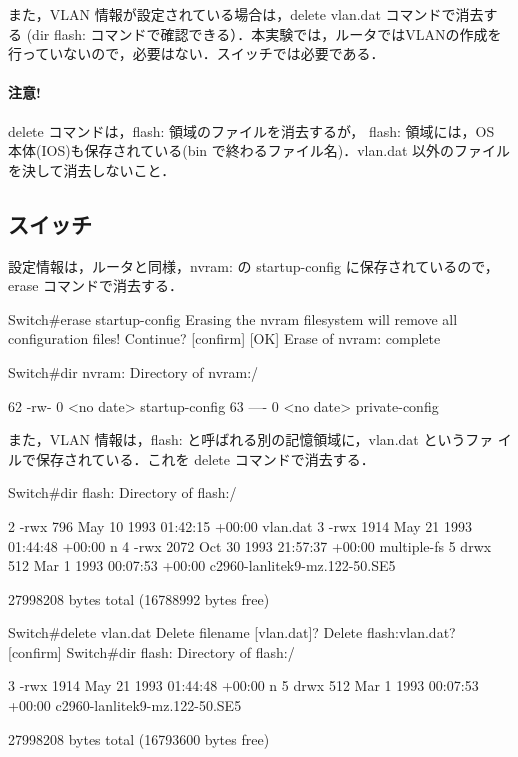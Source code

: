 また，VLAN 情報が設定されている場合は，delete vlan.dat コマンドで消去す
る (dir flash: コマンドで確認できる）．本実験では，ルータではVLANの作成を行っていないので，必要はない．スイッチでは必要である．

\paragraph{注意!} 
delete コマンドは，flash: 領域のファイルを消去するが，
flash: 領域には，OS 本体(IOS)も保存されている(bin で終わるファイル名)．vlan.dat 
以外のファイルを決して消去しないこと．

\subsection*{スイッチ}

設定情報は，ルータと同様，nvram: の startup-config に保存されているので，
erase コマンドで消去する．

\begin{cli}
Switch#erase startup-config
Erasing the nvram filesystem will remove all configuration files!
 Continue? [confirm]
[OK]
Erase of nvram: complete

Switch#dir nvram:
Directory of nvram:/

   62  -rw-           0                    <no date>  startup-config
   63  ----           0                    <no date>  private-config
\end{cli}

また，VLAN 情報は，flash: と呼ばれる別の記憶領域に，vlan.dat というファ
イルで保存されている．これを delete コマンドで消去する．

\begin{cli}
Switch#dir flash:
Directory of flash:/

    2  -rwx         796  May 10 1993 01:42:15 +00:00  vlan.dat
    3  -rwx        1914  May 21 1993 01:44:48 +00:00  n
    4  -rwx        2072  Oct 30 1993 21:57:37 +00:00  multiple-fs
    5  drwx         512   Mar 1 1993 00:07:53 +00:00  c2960-lanlitek9-mz.122-50.SE5

27998208 bytes total (16788992 bytes free)

Switch#delete vlan.dat
Delete filename [vlan.dat]?
Delete flash:vlan.dat? [confirm]
Switch#dir flash:
Directory of flash:/

    3  -rwx        1914  May 21 1993 01:44:48 +00:00  n
    5  drwx         512   Mar 1 1993 00:07:53 +00:00  c2960-lanlitek9-mz.122-50.SE5

27998208 bytes total (16793600 bytes free)
\end{cli}

